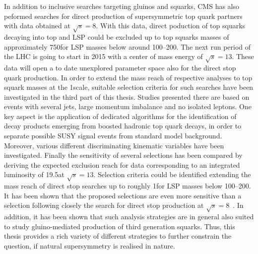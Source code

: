 In addition to inclusive searches targeting gluinos and squarks, CMS has also peformed searches for direct production of supersymmetric top quark partners with data obtained at $\sqrt{s} = 8$\tev. With this data, direct poduction of top squarks decaying into top and LSP could be excluded up to top squarks masses of approximately 750\gev for LSP masses below around 100--200\gev. The next run period of the LHC is going to start in 2015 with a center of mass energy of $\sqrt{s} = 13$\tev. These data will open a to date unexplored parameter space also for the direct stop quark production. In order to extend the mass reach of respective analyses to top squark masses at the 1\tev scale, suitable selection criteria for such searches have been investigated in the third part of this thesis. Studies presented there are based on events with several jets, large momentum imbalance and no isolated leptons. One key aspect is the application of dedicated algorithms for the identification of decay products emerging from boosted hadronic top quark decays, in order to separate possible SUSY signal events from standard model background. Moreover, various different discriminating kinematic variables have been investigated. Finally the sensitivity of several selections has been compared by deriving the expected exclusion reach for data corresponding to an integrated luminosity of 19.5\fbinv at $\sqrt{s} = 13$\tev. Selection criteria could be identified extending the mass reach of direct stop searches up to roughly 1\tev for LSP masses below 100--200\gev. It has been shown that the proposed selections are even more sensitive than a selection following closely the search for direct stop production at $\sqrt{s} = 8$\tev~\cite{CMS-PAS-SUS-13-015}. In addition, it has been shown that such analysis strategies are in general also suited to study gluino-mediated production of third generation squarks. Thus, this thesis provides a rich variety of different strategies to further constrain the question, if natural supersymmetry is realised in nature. 



